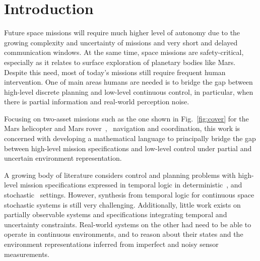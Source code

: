\documentclass[letterpaper]{article} %
\begin{document}

	
	\section{Introduction} \label{subsec:intro}
	Future space missions will require much higher level of autonomy due to the growing complexity and uncertainty of missions and very short and delayed communication windows. At the same time, space missions are safety-critical, especially as it relates to surface exploration of planetary bodies like Mars. Despite this need, most of today's missions still require frequent human intervention. One of main areas humans are needed is to bridge the gap between high-level discrete planning and low-level continuous control, in particular, when there is partial information and real-world perception noise.

    Focusing on two-asset missions such as the one shown in Fig.~\ref{fig:cover} for the Mars helicopter and Mars rover~\cite{traverse2020},~\cite{mars2012} navigation and coordination, this work is concerned with developing a mathematical language to principally bridge the gap between high-level mission specifications and low-level control under partial and uncertain environment representation.
    
    A growing body of literature considers control and planning problems with high-level mission specifications
    expressed in temporal logic in
    deterministic~\cite{KB-TAC08-LTLCon,kress-gazit:whereswaldo?,Murray2009,VaBe-IROS-2013}, and
    stochastic~\cite{Lahijanian2012,svorenova2013,Ayala2014,Cristi-CDC-2016,Kaelbling98} settings.
    However, synthesis from temporal logic for continuous space stochastic systems is still very challenging.
    Additionally, little work exists on partially observable systems and specifications integrating
    temporal and uncertainty constraints.
    Real-world systems on the other had need to be able to operate in continuous environments, and to reason about their states and the environment representations inferred from imperfect and noisy sensor measurements.
    
\end{document}
